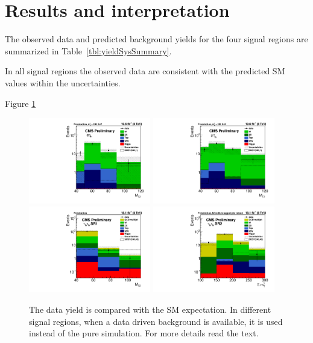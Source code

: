 \section{Results and interpretation}
\label{sect:stat}
The observed data and predicted background yields for the four signal regions are summarized in Table~\ref{tbl:yieldSysSummary}. 

In all signal regions the observed data  are consistent with the predicted SM values within the uncertainties. 

Figure \ref{fig:yield_final}
\begin{figure}[!htb]
\centering
\includegraphics[width=0.475\textwidth,keepaspectratio=true]{StatisticsFig/MT2_tauMTgt200_DDFakeEleTau.pdf}
\includegraphics[width=0.475\textwidth,keepaspectratio=true]{StatisticsFig/MT2muTau_tauMTgt200_DDFake.pdf}
\includegraphics[width=0.475\textwidth,keepaspectratio=true]{StatisticsFig/QCDWestimation_bin1.pdf}
\includegraphics[width=0.475\textwidth,keepaspectratio=true]{StatisticsFig/QCDWestimation_bin2.pdf}
\caption{The data yield is compared with the SM expectation. In different signal regions, 
when a data driven background is available, it is used instead of the pure simulation. For more details read the text.}
\label{fig:yield_final}
\end{figure}
